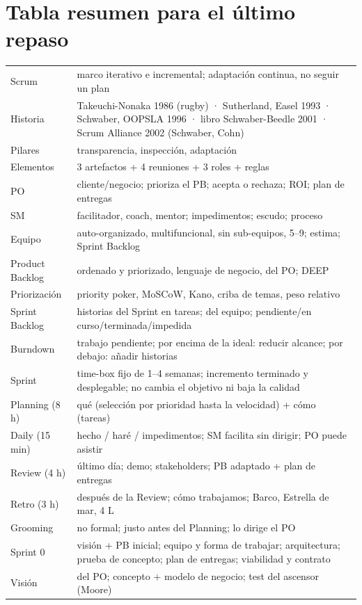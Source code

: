 \documentclass[11pt,a4paper,oneside,openany]{report}
\begin{document}
\section*{Tabla resumen para el último repaso}
\begin{center}\small
\begin{tabular}{p{3.3cm}p{10.8cm}}
\toprule
Scrum & marco iterativo e incremental; adaptación continua, no seguir un plan \\
Historia & Takeuchi-Nonaka 1986 (rugby) · Sutherland, Easel 1993 · Schwaber, OOPSLA 1996 · libro Schwaber-Beedle 2001 · Scrum Alliance 2002 (Schwaber, Cohn) \\
Pilares & transparencia, inspección, adaptación \\
Elementos & 3 artefactos + 4 reuniones + 3 roles + reglas \\
PO & cliente/negocio; prioriza el PB; acepta o rechaza; ROI; plan de entregas \\
SM & facilitador, coach, mentor; impedimentos; escudo; proceso \\
Equipo & auto-organizado, multifuncional, sin sub-equipos, 5--9; estima; Sprint Backlog \\
Product Backlog & ordenado y priorizado, lenguaje de negocio, del PO; DEEP \\
Priorización & priority poker, MoSCoW, Kano, criba de temas, peso relativo \\
Sprint Backlog & historias del Sprint en tareas; del equipo; pendiente/en curso/terminada/impedida \\
Burndown & trabajo pendiente; por encima de la ideal: reducir alcance; por debajo: añadir historias \\
Sprint & time-box fijo de 1--4 semanas; incremento terminado y desplegable; no cambia el objetivo ni baja la calidad \\
Planning (8 h) & qué (selección por prioridad hasta la velocidad) + cómo (tareas) \\
Daily (15 min) & hecho / haré / impedimentos; SM facilita sin dirigir; PO puede asistir \\
Review (4 h) & último día; demo; stakeholders; PB adaptado + plan de entregas \\
Retro (3 h) & después de la Review; cómo trabajamos; Barco, Estrella de mar, 4 L \\
Grooming & no formal; justo antes del Planning; lo dirige el PO \\
Sprint 0 & visión + PB inicial; equipo y forma de trabajar; arquitectura; prueba de concepto; plan de entregas; viabilidad y contrato \\
Visión & del PO; concepto + modelo de negocio; test del ascensor (Moore) \\
\bottomrule
\end{tabular}
\end{center}
\end{document}
